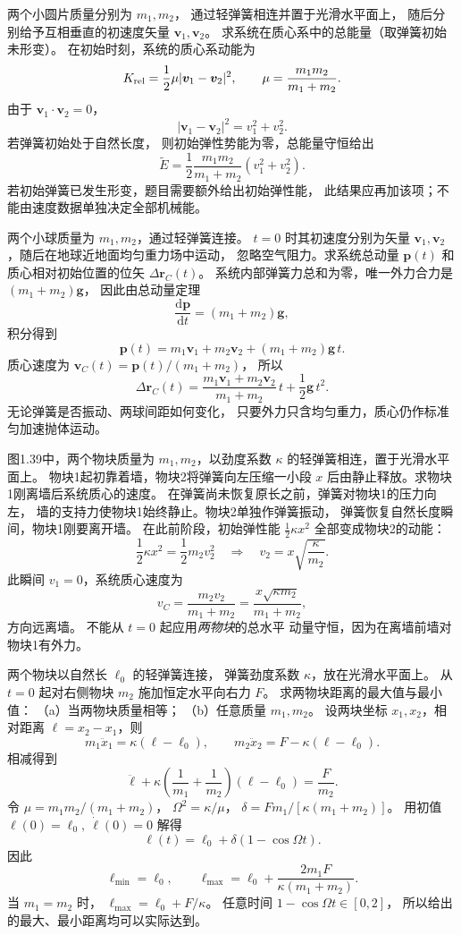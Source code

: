 两个小圆片质量分别为 $m_1,m_2$，
通过轻弹簧相连并置于光滑水平面上，
随后分别给予互相垂直的初速度矢量
$\bm v_1,\bm v_2$。
求系统在质心系中的总能量（取弹簧初始未形变）。
\exsolution
在初始时刻，系统的质心系动能为
\[
K_{\rm rel}
=\frac12\mu|\bm v_1-\bm v_2|^2,\qquad
\mu=\frac{m_1m_2}{m_1+m_2}.
\]
由于 $\bm v_1\cdot\bm v_2=0$，
\[
|\bm v_1-\bm v_2|^2=v_1^2+v_2^2.
\]
若弹簧初始处于自然长度，
则初始弹性势能为零，总能量守恒给出
\[
\boxed{\widetilde E=
\frac12\frac{m_1m_2}{m_1+m_2}(v_1^2+v_2^2)}.
\]
\excheck 若初始弹簧已发生形变，题目需要额外给出初始弹性能，
此结果应再加该项；不能由速度数据单独决定全部机械能。

两个小球质量为 $m_1,m_2$，通过轻弹簧连接。
$t=0$ 时其初速度分别为矢量
$\bm v_1,\bm v_2$，随后在地球近地面均匀重力场中运动，
忽略空气阻力。求系统总动量 $\bm p(t)$
和质心相对初始位置的位矢 $\Delta\bm r_C(t)$。
\exsolution
系统内部弹簧力总和为零，唯一外力合力是
$(m_1+m_2)\bm g$，
因此由总动量定理
\[
\frac{\mathrm d\bm p}{\mathrm dt}=(m_1+m_2)\bm g,
\]
积分得到
\[
\boxed{\bm p(t)=m_1\bm v_1+m_2\bm v_2
 +(m_1+m_2)\bm g\,t}.
\]
质心速度为
$\bm v_C(t)=\bm p(t)/(m_1+m_2)$，
所以
\[
\boxed{\Delta\bm r_C(t)=
\frac{m_1\bm v_1+m_2\bm v_2}{m_1+m_2}\,t
+\frac12\bm g\,t^2}.
\]
\excheck 无论弹簧是否振动、两球间距如何变化，
只要外力只含均匀重力，质心仍作标准匀加速抛体运动。

图1.39中，两个物块质量为 $m_1,m_2$，以劲度系数
$\kappa$ 的轻弹簧相连，置于光滑水平面上。
物块1起初靠着墙，物块2将弹簧向左压缩一小段
$x$ 后由静止释放。求物块1刚离墙后系统质心的速度。
\exsolution
在弹簧尚未恢复原长之前，弹簧对物块1的压力向左，
墙的支持力使物块1始终静止。物块2单独作弹簧振动，
弹簧恢复自然长度瞬间，物块1刚要离开墙。
在此前阶段，初始弹性能
$\tfrac12\kappa x^2$ 全部变成物块2的动能：
\[
\frac12\kappa x^2=\frac12m_2v_2^2
\quad\Longrightarrow\quad
v_2=x\sqrt{\frac{\kappa}{m_2}}.
\]
此瞬间 $v_1=0$，系统质心速度为
\[
\boxed{v_C=\frac{m_2v_2}{m_1+m_2}
=\frac{x\sqrt{\kappa m_2}}{m_1+m_2}},
\]
方向远离墙。
\excheck 不能从 $t=0$ 起应用\emph{两物块}的总水平
动量守恒，因为在离墙前墙对物块1有外力。

两个物块以自然长 $\ell_0$ 的轻弹簧连接，
弹簧劲度系数 $\kappa$，放在光滑水平面上。
从 $t=0$ 起对右侧物块 $m_2$ 施加恒定水平向右力 $F$。
求两物块距离的最大值与最小值：
（a）当两物块质量相等；
（b）任意质量 $m_1,m_2$。
\exsolution
设两块坐标 $x_1,x_2$，相对距离
$\ell=x_2-x_1$，则
\[
m_1\ddot x_1=\kappa(\ell-\ell_0),\qquad
m_2\ddot x_2=F-\kappa(\ell-\ell_0).
\]
相减得到
\[
\ddot\ell+\kappa\left(\frac1{m_1}+\frac1{m_2}\right)
(\ell-\ell_0)=\frac F{m_2}.
\]
令 $\mu=m_1m_2/(m_1+m_2)$，
$\Omega^2=\kappa/\mu$，
$\delta=Fm_1/[\kappa(m_1+m_2)]$。
用初值 $\ell(0)=\ell_0,\ \dot\ell(0)=0$ 解得
\[
\ell(t)=\ell_0+\delta(1-\cos\Omega t).
\]
因此
\[
\boxed{\ell_{\min}=\ell_0,\qquad
\ell_{\max}=\ell_0+\frac{2m_1F}{\kappa(m_1+m_2)}}.
\]
当 $m_1=m_2$ 时，
$\boxed{\ell_{\max}=\ell_0+F/\kappa}$。
\excheck 任意时间 $1-\cos\Omega t\in[0,2]$，
所以给出的最大、最小距离均可以实际达到。

